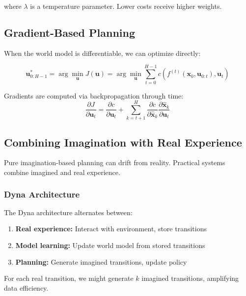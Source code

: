 where $\lambda$ is a temperature parameter. Lower costs receive higher weights.

\subsection{Gradient-Based Planning}

When the world model is differentiable, we can optimize directly:

\begin{equation}
\mathbf{u}_{0:H-1}^* = \arg\min_{\mathbf{u}} J(\mathbf{u}) = \arg\min_{\mathbf{u}} \sum_{t=0}^{H-1} c(f^{(t)}(\mathbf{x}_0, \mathbf{u}_{0:t}), \mathbf{u}_t)
\end{equation}

Gradients are computed via backpropagation through time:
\begin{equation}
\frac{\partial J}{\partial \mathbf{u}_t} = \frac{\partial c}{\partial \mathbf{u}_t} + \sum_{k=t+1}^{H} \frac{\partial c}{\partial \hat{\mathbf{x}}_k} \frac{\partial \hat{\mathbf{x}}_k}{\partial \mathbf{u}_t}
\end{equation}


\subsection{Combining Imagination with Real Experience}

Pure imagination-based planning can drift from reality. Practical systems combine imagined and real experience.

\subsubsection{Dyna Architecture}

The Dyna architecture alternates between:
\begin{enumerate}
    \item \textbf{Real experience:} Interact with environment, store transitions
    \item \textbf{Model learning:} Update world model from stored transitions
    \item \textbf{Planning:} Generate imagined transitions, update policy
\end{enumerate}

For each real transition, we might generate $k$ imagined transitions, amplifying data efficiency.

